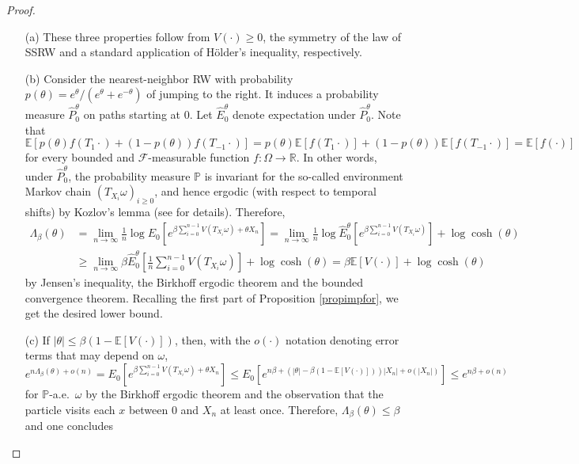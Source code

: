 \documentclass[a4paper]{amsart}
\numberwithin{equation}{section}
\theoremstyle{plain}
\theoremstyle{remark}
\begin{document}
\begin{proof}
	\begin{itemize}
		\item [(a)] These three properties follow from $V(\cdot)\ge0$, the symmetry of the law of SSRW and a standard application of H\"older's inequality, respectively.
		\item [(b)] Consider the nearest-neighbor RW with probability $p(\theta) = e^\theta/(e^\theta + e^{-\theta})$ of jumping to the right.
		It induces a probability measure $\hat P_0^\theta$ on paths starting at $0$. Let $\hat E_0^\theta$ denote expectation under $\hat P_0^\theta$. Note that
		$$\mathbb{E}[p(\theta)f(T_1\cdot) + (1-p(\theta))f(T_{-1}\cdot)] = p(\theta)\mathbb{E}[f(T_1\cdot)] + (1-p(\theta))\mathbb{E}[f(T_{-1}\cdot)] = \mathbb{E}[f(\cdot)]$$
		for every bounded and $\mathcal{F}$-measurable function $f:\Omega\to\mathbb{R}$. In other words, under $\hat P_0^\theta$, 
		the probability measure $\mathbb{P}$ is invariant for 
		the so-called environment Markov chain 
		$(T_{X_i}\omega)_{i\ge0}$, and hence 
		ergodic 
		{}{(with respect to temporal shifts)}
		by Kozlov's lemma (see \cite{Koz1985} for details). Therefore,
		\begin{align*}
		\Lambda_\beta(\theta) &= \lim_{n\to\infty}\frac1{n}\log E_0\left[e^{\beta\sum_{i=0}^{n-1}V(T_{X_i}\omega) + \theta X_n}\right] = \lim_{n\to\infty}\frac1{n}\log \hat E_0^\theta\left[e^{\beta\sum_{i=0}^{n-1}V(T_{X_i}\omega)}\right] + \log\cosh(\theta)\\
		&\ge \lim_{n\to\infty}\beta\hat E_0^\theta\left[\frac1{n}\sum_{i=0}^{n-1}V(T_{X_i}\omega)\right] + \log\cosh(\theta) = \beta\mathbb{E}[V(\cdot)] + \log\cosh(\theta)
		\end{align*}
		by Jensen's inequality, the Birkhoff ergodic theorem and the bounded convergence theorem. Recalling the first part of Proposition \ref{propimpfor}, we get the desired lower bound.
		\item [(c)] If $|\theta| \le \beta(1 - \mathbb{E}[V(\cdot)])$, 
		  then, 
		  {}{with the $o(\cdot)$ notation denoting 
		    error terms that may depend
		on $\omega$,}
		$$e^{n\Lambda_\beta(\theta) + o(n)} = E_0\left[e^{\beta\sum_{i=0}^{n-1} V(T_{X_i}\omega) + \theta X_n}\right] \le E_0\left[e^{n\beta + (|\theta| - \beta(1 - \mathbb{E}[V(\cdot)]))|X_n| + o(|X_n|)}\right] \le e^{n\beta + o(n)}$$
		for $\mathbb{P}$-a.e.\ $\omega$ by the Birkhoff ergodic theorem and the observation that the particle visits each $x$ between $0$ and $X_n$ at least once. Therefore, {}{$\Lambda_\beta(\theta)\le\beta$ and one concludes
}
\end{itemize}
\end{proof}
\end{document}
